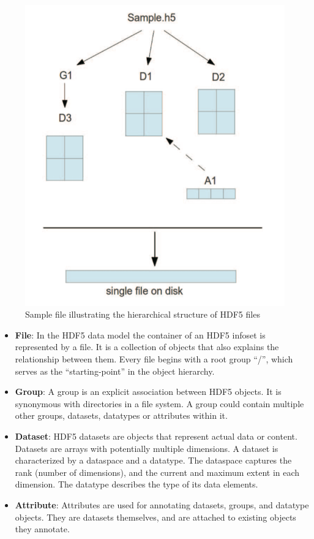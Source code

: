 \documentclass[conference]{IEEEtran}
\begin{document}
\begin{figure}[htbp]
\centering
\includegraphics[width=\columnwidth]{images/hdf5.png}
\caption{Sample file illustrating the hierarchical structure of HDF5 files}
\label{fig:hdf5-sample}
\end{figure}

\begin{itemize}

\item
  \textbf{File}: In the HDF5 data model the container of an HDF5 infoset
  is represented by a file. It is a collection of objects that also
  explains the relationship between them. Every file begins with a root
  group ``/'', which serves as the ``starting-point'' in the object
  hierarchy.

\item
  \textbf{Group}: A group is an explicit association between HDF5
  objects. It is synonymous with directories in a file system. A group
  could contain multiple other groups, datasets, datatypes or attributes within
  it.

\item
  \textbf{Dataset}: HDF5 datasets are objects that represent actual data
  or content. Datasets are arrays with potentially multiple dimensions. A
  dataset is characterized by a dataspace and a datatype. The dataspace
  captures the rank (number of dimensions), and the current and maximum
  extent in each dimension. The datatype describes the type of its data
  elements.

\item
  \textbf{Attribute}: Attributes are used for annotating datasets,
  groups, and datatype objects. They are datasets themselves, and are
  attached to existing objects they annotate.

\end{itemize}
\end{document}
